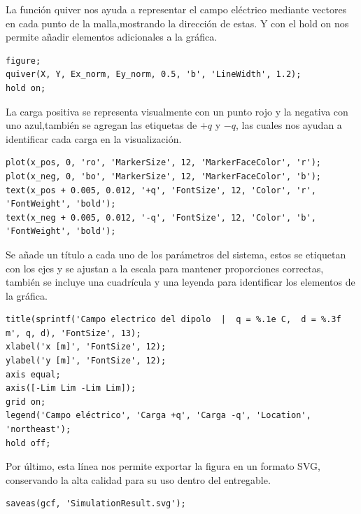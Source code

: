\tab La función quiver nos ayuda a representar el campo eléctrico mediante vectores en cada punto de la malla,mostrando la dirección de estas. Y con el hold on nos permite añadir elementos adicionales a la gráfica.

\begin{lstlisting}[style=Matlab-editor]
%% Graficamos el campo electrico
figure;
quiver(X, Y, Ex_norm, Ey_norm, 0.5, 'b', 'LineWidth', 1.2);
hold on;
\end{lstlisting}

\tab La carga positiva se representa visualmente con un punto rojo y la negativa con uno azul,también se agregan las etiquetas de $+q$ y $-q$, las cuales nos ayudan a identificar cada carga en la visualización.

\begin{lstlisting}[style=Matlab-editor]
%% Marcamos la posicion de las cargas
plot(x_pos, 0, 'ro', 'MarkerSize', 12, 'MarkerFaceColor', 'r');
plot(x_neg, 0, 'bo', 'MarkerSize', 12, 'MarkerFaceColor', 'b');
text(x_pos + 0.005, 0.012, '+q', 'FontSize', 12, 'Color', 'r', 'FontWeight', 'bold');
text(x_neg + 0.005, 0.012, '-q', 'FontSize', 12, 'Color', 'b', 'FontWeight', 'bold');
\end{lstlisting}

\tab Se añade un título a cada uno de los parámetros del sistema, estos se etiquetan con los ejes y se ajustan a la escala para mantener proporciones correctas, también se incluye una cuadrícula y una leyenda para identificar los elementos de la gráfica.

\begin{lstlisting}[style=Matlab-editor]
%% Formato de la figura
title(sprintf('Campo electrico del dipolo  |  q = %.1e C,  d = %.3f m', q, d), 'FontSize', 13);
xlabel('x [m]', 'FontSize', 12);
ylabel('y [m]', 'FontSize', 12);
axis equal;
axis([-Lim Lim -Lim Lim]);
grid on;
legend('Campo eléctrico', 'Carga +q', 'Carga -q', 'Location', 'northeast');
hold off;
\end{lstlisting}

\tab Por último, esta línea nos permite exportar la figura en un formato SVG, conservando la alta calidad para su uso dentro del entregable.
\begin{lstlisting}[style=Matlab-editor]
%% Guardar con SVG
saveas(gcf, 'SimulationResult.svg');
\end{lstlisting}